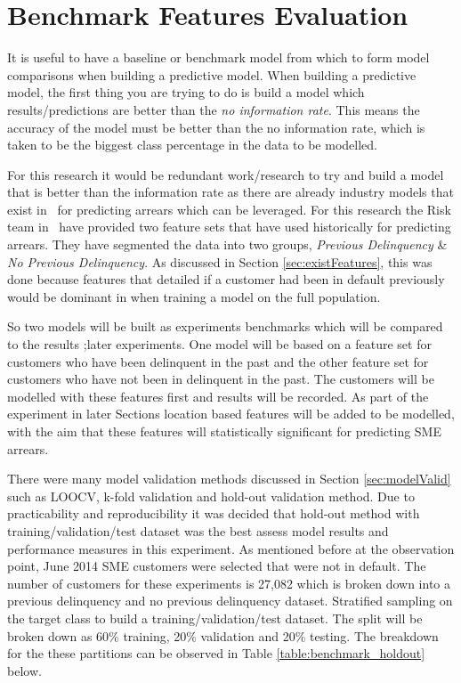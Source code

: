 \section{Benchmark Features Evaluation}\label{sec:benchFeature}
It is useful to have a baseline or benchmark model from which to form model comparisons when building a predictive model. When building a predictive model, the first thing you are trying to do is build a model which results/predictions are better than the \textit{no information rate}. This means the accuracy of the model must be better than the no information rate, which is taken to be the biggest class percentage in the data to be modelled. 

For this research it would be redundant work/research to try and build a model that is better than the information rate as there are already industry models that exist in \subjectname\ for predicting arrears which can be leveraged. For this research the Risk team in \subjectname\ have provided two feature sets that have used historically for predicting arrears. They have segmented the data into two groups, \textit{Previous Delinquency} \& \textit{No Previous Delinquency}. As discussed in Section \ref{sec:existFeatures}, this was done because features that detailed if a customer had been in default previously would be dominant in when training a model on the full population.

So two models will be built as experiments benchmarks which will be compared to the results ;later experiments. One model will be based on a feature set for customers who have been delinquent in the past and the other feature set for customers who have not been in delinquent in the past. The customers will be modelled with these features first and results will be recorded. As part of the experiment in later Sections location based features will be added to be modelled, with the aim that these features will statistically significant for predicting SME arrears. 

There were many model validation methods discussed in Section \ref{sec:modelValid} such as LOOCV, k-fold validation and hold-out validation method. Due to practicability and reproducibility it was decided that hold-out method with training/validation/test dataset was the best assess model results and performance measures in this experiment. As mentioned before at the observation point, June 2014 SME customers were selected that were not in default. The number of customers for these experiments is 27,082 which is broken down into a previous delinquency and no previous delinquency dataset. Stratified sampling on the target class to build a training/validation/test dataset. The split will be broken down as 60\% training, 20\% validation and 20\% testing. The breakdown for the these partitions can be observed in Table \ref{table:benchmark_holdout} below. 

